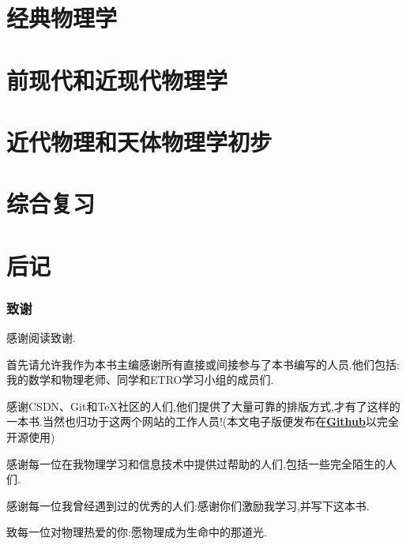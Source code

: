 \documentclass[UTF8,a4paper]{ctexrep}
\begin{document}
	\part{ 经典物理学}
	
	\newpage
	
	\newpage
	
	\newpage
	
	\newpage
	
	\newpage
	
	\newpage
	
	\newpage
	
	\newpage
	\part{前现代和近现代物理学}
	
	\newpage
	
	\newpage
	
	\newpage
	
	\newpage
	
	\newpage 
	\part{近代物理和天体物理学初步}
	
	\newpage
	
	\newpage
	\part{综合复习}
	
	\newpage
	\part{后记}
	\section*{致谢} 
	感谢阅读致谢.
	
	
	首先请允许我作为本书主编感谢所有直接或间接参与了本书编写的人员.他们包括:我的数学和物理老师、同学和ETRO学习小组的成员们.
	
	
	感谢CSDN、Git和\TeX 社区的人们,他们提供了大量可靠的排版方式,才有了这样的一本书.当然也归功于这两个网站的工作人员!(本文电子版便发布在\href{https://github.com/ZYpS-leader/Physics}{\textbf{Github}}以完全开源使用)
	
	
	感谢每一位在我物理学习和信息技术中提供过帮助的人们,包括一些完全陌生的人们.
	
	
	感谢每一位我曾经遇到过的优秀的人们:感谢你们激励我学习,并写下这本书.
	
	
	致每一位对物理热爱的你:愿物理成为生命中的那道光.
	\newpage
	 
	
		
	 
	
\end{document}
